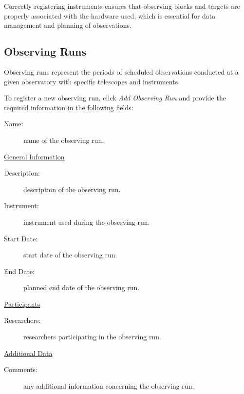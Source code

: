 
Correctly registering instruments ensures that observing blocks and targets are properly associated with the hardware used, which is essential for data management and planning of observations.


\subsection{Observing Runs}

Observing runs represent the periods of scheduled observations conducted at a given observatory with specific telescopes and instruments. 

To register a new observing run, click \textsl{Add Observing Run} and provide the required information in the following fields:

\begin{description}
	\item[Name:] name of the observing run.
\end{description}


\newpage

\underline{General Information}

\begin{description}
	\item[Description:] description of the observing run.
	\item[Instrument:] instrument used during the observing run.
	\item[Start Date:] start date of the observing run.
	\item[End Date:] planned end date of the observing run.
\end{description}



\underline{Participants}

\begin{description}
	\item[Researchers:] researchers participating in the observing run.
\end{description}


\underline{Additional Data}

\begin{description}
	\item[Comments:] any additional information concerning the observing run.
\end{description}

